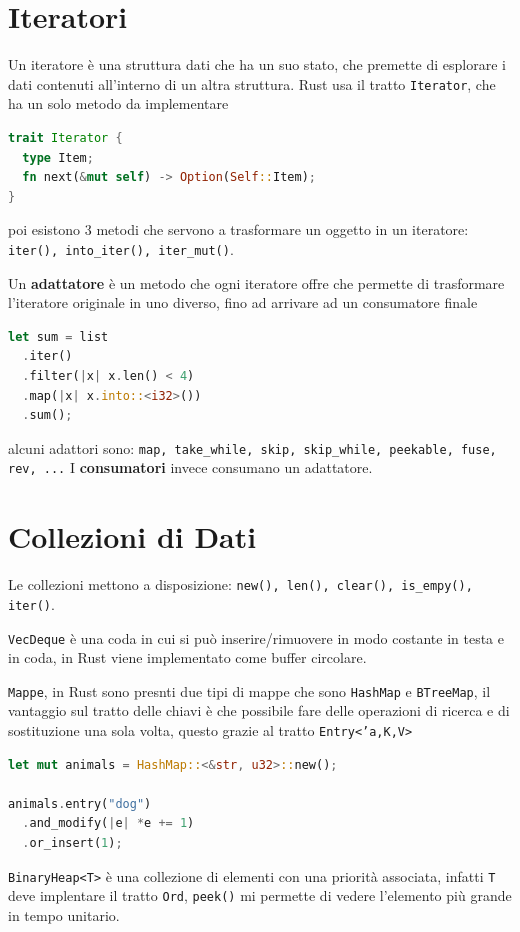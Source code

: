 \documentclass[12pt]{article}
\begin{document}
\section{Iteratori}
Un iteratore \`e una struttura dati che ha un suo stato, che premette di esplorare i dati contenuti all'interno di un altra struttura. Rust usa il tratto \texttt{Iterator}, che ha un solo metodo da implementare
\begin{lstlisting}[language=rust]
trait Iterator {
  type Item;
  fn next(&mut self) -> Option(Self::Item);
}
\end{lstlisting}
poi esistono 3 metodi che servono a trasformare un oggetto in un iteratore: \texttt{iter(), into\_iter(), iter\_mut()}.

Un \textbf{adattatore} \`e un metodo che ogni iteratore offre che permette di trasformare l'iteratore originale in uno diverso, fino ad arrivare ad un consumatore finale
\begin{lstlisting}[language=rust]
let sum = list
  .iter()
  .filter(|x| x.len() < 4)
  .map(|x| x.into::<i32>())
  .sum();
\end{lstlisting}
alcuni adattori sono: \texttt{map, take_while, skip, skip\_while, peekable, fuse, rev, ...} I \textbf{consumatori} invece consumano un adattatore.


\section{Collezioni di Dati}
Le collezioni mettono a disposizione: \texttt{new(), len(), clear(), is\_empy(), iter()}.

\texttt{VecDeque} \`e una coda in cui si pu\`o inserire/rimuovere in modo costante in testa e in coda, in Rust viene implementato come buffer circolare.

\texttt{Mappe}, in Rust sono presnti due tipi di mappe che sono \texttt{HashMap} e \texttt{BTreeMap}, il vantaggio sul tratto delle chiavi \`e che possibile fare delle operazioni di ricerca e di sostituzione una sola volta, questo grazie al tratto \texttt{Entry<'a,K,V>}
\begin{lstlisting}[language=rust]
let mut animals = HashMap::<&str, u32>::new();

animals.entry("dog")
  .and_modify(|e| *e += 1)
  .or_insert(1);
\end{lstlisting}

\texttt{BinaryHeap<T>} \`e una collezione di elementi con una priorit\`a associata, infatti \texttt{T} deve implentare il tratto \texttt{Ord}, \texttt{peek()} mi permette di vedere l'elemento pi\`u grande in tempo unitario.
\end{document}
